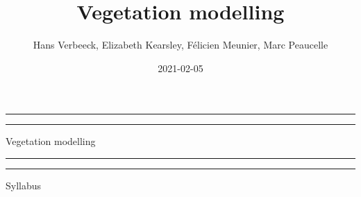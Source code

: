 \documentclass[
  oneside]{book}
\title{Vegetation modelling}
\author{Hans Verbeeck, Elizabeth Kearsley, Félicien Meunier, Marc Peaucelle}
\date{2021-02-05}
\begin{document}
\maketitle

\newcommand{\plogo}{\fbox{$\mathcal{PL}$}} %
\frontmatter


\begin{titlepage} %

	\centering %
	
	\scshape %
	
	\vspace*{\baselineskip} %
	
	
	\vspace{12\baselineskip}
	
	\rule{\textwidth}{1.6pt}\vspace*{-\baselineskip}\vspace*{2pt} %
	\rule{\textwidth}{0.4pt} %
	
	\vspace{0.75\baselineskip} %
	
	{\LARGE Vegetation modelling\\} %
	
	\vspace{0.75\baselineskip} %
	
	\rule{\textwidth}{0.4pt}\vspace*{-\baselineskip}\vspace{3.2pt} %
	\rule{\textwidth}{1.6pt} %
	
	\vspace{2\baselineskip} %
	
	
	Syllabus %
	
	\vspace*{3\baselineskip} %
	
	

\end{titlepage}
\end{document}

